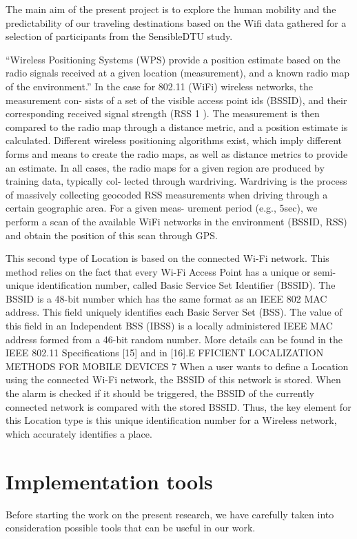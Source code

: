 The main aim of the present project is to explore the human mobility and the
predictability of our traveling destinations based on the Wifi data gathered for
a selection of participants from the SensibleDTU study.  

 
``Wireless Positioning Systems (WPS)
provide a position estimate based on the radio signals received at a given location (measurement), and a known radio map of the
environment.''\cite{athanasiou2009utilizing} In the case for 802.11 (WiFi) wireless networks, the
measurement con- sists of a set of the visible access point ids (BSSID), and their corresponding received
signal strength (RSS 1 ). The measurement is then compared to the radio map through a
distance metric, and a position estimate is calculated.
Different wireless positioning algorithms exist, which imply different forms and
means to create the radio maps, as well as distance metrics to provide an estimate. In all
cases, the radio maps for a given region are produced by training data, typically col-
lected through wardriving. Wardriving is the process of massively collecting geocoded
RSS measurements when driving through a certain geographic area. For a given meas-
urement period (e.g., 5sec), we perform a scan of the available WiFi networks in the
environment (BSSID, RSS) and obtain the position of this scan through GPS.


This second type of Location is based on the connected Wi-Fi network. This method relies on the fact
that every Wi-Fi Access Point has a unique or semi-unique identification number, called Basic Service
Set Identifier (BSSID).
The BSSID is a 48-bit number which has the same format as an IEEE 802 MAC address. This field
uniquely identifies each Basic Server Set (BSS). The value of this field in an Independent BSS (IBSS) is a
locally administered IEEE MAC address formed from a 46-bit random number. More details can be
found in the IEEE 802.11 Specifications [15] and in [16].E FFICIENT LOCALIZATION METHODS FOR MOBILE DEVICES
7
When a user wants to define a Location using the connected Wi-Fi network, the BSSID of this
network is stored. When the alarm is checked if it should be triggered, the BSSID of the currently
connected network is compared with the stored BSSID. Thus, the key element for this Location type
is this unique identification number for a Wireless network, which accurately identifies a place.

\section{Implementation tools}
Before starting the work on the present research, we have carefully taken into
consideration possible tools that can be useful in our work.

